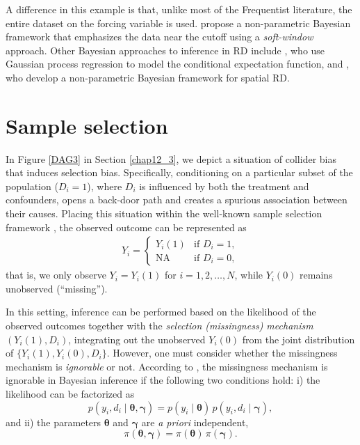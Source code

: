 A difference in this example is that, unlike most of the Frequentist literature, the entire dataset on the forcing variable is used. \cite{chib2023nonparametric} propose a non-parametric Bayesian framework that emphasizes the data near the cutoff using a \textit{soft-window} approach. Other Bayesian approaches to inference in RD include \cite{branson2019nonparametric}, who use Gaussian process regression to model the conditional expectation function, and \cite{rischard2020bayesian}, who develop a non-parametric Bayesian framework for spatial RD.

\section{Sample selection}\label{sec12_8}

In Figure \ref{DAG3} in Section \ref{chap12_3}, we depict a situation of collider bias that induces selection bias. Specifically, conditioning on a particular subset of the population ($D_i=1$), where $D_i$ is influenced by both the treatment and confounders, opens a back-door path and creates a spurious association between their causes. Placing this situation within the well-known sample selection framework \cite{heckman1979sample}, the observed outcome can be represented as
\begin{align*}
	Y_i = \begin{cases}
		Y_i(1) & \text{if } D_i=1, \\
		\text{NA} & \text{if } D_i=0,
	\end{cases}
\end{align*}
that is, we only observe $Y_i = Y_i(1)$ for $i=1,2,\dots,N$, while $Y_i(0)$ remains unobserved (``missing'').

In this setting, inference can be performed based on the likelihood of the observed outcomes together with the \textit{selection (missingness) mechanism} $(Y_i(1),D_i)$, integrating out the unobserved $Y_i(0)$ from the joint distribution of $\{Y_i(1),Y_i(0),D_i\}$. However, one must consider whether the missingness mechanism is \textit{ignorable} or not. According to \cite{little2019statistical}, the missingness mechanism is ignorable in Bayesian inference if the following two conditions hold:  
i) the likelihood can be factorized as
\[
p(y_i, d_i\mid \boldsymbol{\theta},\boldsymbol{\gamma}) 
= p(y_i\mid \boldsymbol{\theta})\, p(y_i,d_i \mid \boldsymbol{\gamma}),
\] 
and  
ii) the parameters $\boldsymbol{\theta}$ and $\boldsymbol{\gamma}$ are \emph{a priori} independent,
\[
\pi(\boldsymbol{\theta},\boldsymbol{\gamma}) 
= \pi(\boldsymbol{\theta})\,\pi(\boldsymbol{\gamma}).
\]

